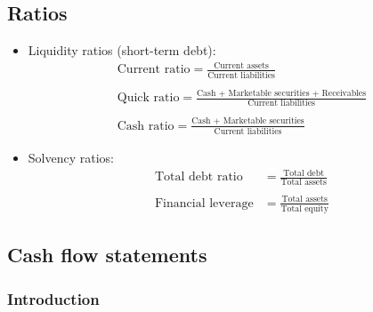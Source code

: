 \documentclass[../notes_compiled.tex]{subfiles}
\begin{document}
\subsection{Ratios}
\begin{itemize}
\item Liquidity ratios (short-term debt):
\begin{gather}
\text{Current ratio} = \frac{\text{Current assets}}{\text{Current liabilities}} \label{currentratio}\\ \\
\text{Quick ratio} = \frac{\text{Cash + Marketable securities + Receivables}}{\text{Current liabilities}} \label{quickratio} \\ \\
\text{Cash ratio} = \frac{\text{Cash + Marketable securities}}{\text{Current liabilities}} \label{cashratio}
\end{gather}

\item Solvency ratios:
\begin{align}
\text{Total debt ratio} &= \frac{\text{Total debt}}{\text{Total assets}} \\ \nonumber \\
\text{Financial leverage} &= \frac{\text{Total assets}}{\text{Total equity}}
\end{align}

\end{itemize}


\subsection{Cash flow statements}

\subsubsection{Introduction}
\end{document}
